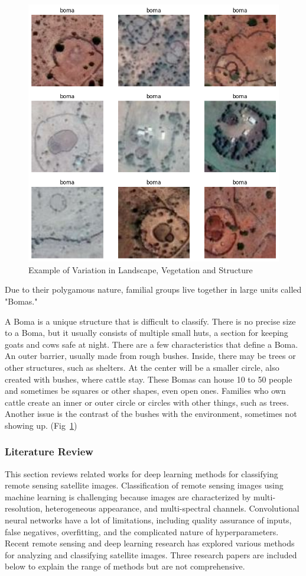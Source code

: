 \documentclass[10pt]{article}
\begin{document}
\begin{figure} [H]
    \centering
    \includegraphics[width=0.8\linewidth]{images/types of bomas.png}
    \caption{Example of Variation in Landscape, Vegetation and Structure}
    \label{fig:types_of_bomas}
\end{figure}

Due to their polygamous nature, familial groups live together in large units called "Bomas." 

A Boma is a unique structure that is difficult to classify. There is no precise size to a Boma, but it usually consists of multiple small huts, a section for keeping goats and cows safe at night. There are a few characteristics that define a Boma. An outer barrier, usually made from rough bushes. Inside, there may be trees or other structures, such as shelters. At the center will be a smaller circle, also created with bushes, where cattle stay. These Bomas can house 10 to 50 people and sometimes be squares or other shapes, even open ones. Families who own cattle create an inner or outer circle or circles with other things, such as trees. Another issue is the contrast of the bushes with the environment, sometimes not showing up. (Fig~\ref{fig:types_of_bomas})

\subsubsection{Literature Review}

This section reviews related works for deep learning methods for classifying remote sensing satellite images. Classification of remote sensing images using machine learning is challenging because images are characterized by multi-resolution, heterogeneous appearance, and multi-spectral channels. Convolutional neural networks have a lot of limitations, including quality assurance of inputs, false negatives, overfitting, and the complicated nature of hyperparameters. Recent remote sensing and deep learning research has explored various methods for analyzing and classifying satellite images. Three research papers are included below to explain the range of methods but are not comprehensive.
\end{document}
